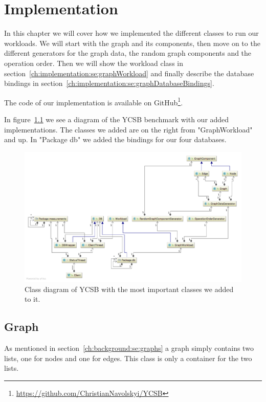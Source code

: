 \chapter{Implementation}
\label{ch:implementation}
In this chapter we will cover how we implemented the different classes to run our workloads.
We will start with the graph and its components,
then move on to the different generators for the graph data,
the random graph components and the operation order.
Then we will show the workload class in section~\ref{ch:implementation:se:graphWorkload} and finally describe the database bindings in section~\ref{ch:implementation:se:graphDatabaseBindings}.

The code of our implementation is available on GitHub\footnote{\url{https://github.com/ChristianNavolskyi/YCSB}}.

In figure~\ref{fig:YCSBExtension} we see a diagram of the YCSB benchmark with our added implementations.
The classes we added are on the right from "GraphWorkload" and up.
In "Package db" we added the bindings for our four databases.

\begin{figure}
  \includegraphics[angle=90,height=\textheight]{images/benchmarks/extendedYCSBWorkflow}
  \caption{Class diagram of YCSB with the most important classes we added to it.}
  \label{fig:YCSBExtension}
\end{figure}

\section{Graph}
As mentioned in section~\ref{ch:background:se:graphs} a graph simply contains two lists,
one for nodes and one for edges.
This class is only a container for the two lists.

